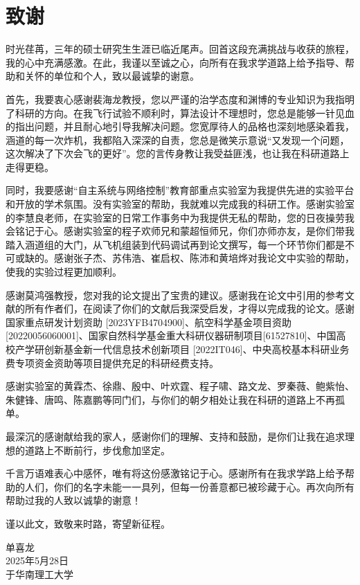\chapter{致\texorpdfstring{\quad}{}谢}

时光荏苒，三年的硕士研究生生涯已临近尾声。回首这段充满挑战与收获的旅程，我的心中充满感激。在此，我谨以至诚之心，向所有在我求学道路上给予指导、帮助和关怀的单位和个人，致以最诚挚的谢意。

首先，我要衷心感谢裴海龙教授，您以严谨的治学态度和渊博的专业知识为我指明了科研的方向。在我飞行试验不顺利时，算法设计不理想时，您总是能够一针见血的指出问题，并且耐心地引导我解决问题。您宽厚待人的品格也深刻地感染着我，涵道的每一次炸机，我都陷入深深的自责，您总是微笑示意说“又发现一个问题，这次解决了下次会飞的更好”。您的言传身教让我受益匪浅，也让我在科研道路上走得更稳。

同时，我要感谢“自主系统与网络控制”教育部重点实验室为我提供先进的实验平台和开放的学术氛围。没有实验室的帮助，我就难以完成我的科研工作。感谢实验室的李慧良老师，在实验室的日常工作事务中为我提供无私的帮助，您的日夜操劳我会铭记于心。感谢实验室的程子欢师兄和蒙超恒师兄，你们亦师亦友，是你们带我踏入涵道组的大门，从飞机组装到代码调试再到论文撰写，每一个环节你们都是不可或缺的。感谢张子杰、苏伟浩、崔启权、陈沛和黄培烨对我论文中实验的帮助，使我的实验过程更加顺利。

感谢莫鸿强教授，您对我的论文提出了宝贵的建议。感谢我在论文中引用的参考文献的所有作者们，在阅读了你们的文献后我深受启发，才得以完成我的论文。感谢国家重点研发计划资助 [2023YFB4704900]、航空科学基金项目资助 [20220056060001]、国家自然科学基金重大科研仪器研制项目[61527810]、中国高校产学研创新基金新一代信息技术创新项目 [2022IT046]、中央高校基本科研业务费专项资金资助等项目提供充足的科研经费支持。

感谢实验室的黄霖杰、徐鼎、殷中、叶欢霆、程子啸、路文龙、罗秦薇、鲍紫怡、朱健锋、唐鸣、陈嘉鹏等同门们，与你们的朝夕相处让我在科研的道路上不再孤单。

最深沉的感谢献给我的家人，感谢你们的理解、支持和鼓励，是你们让我在追求理想的道路上不断前行，步伐愈加坚定。

千言万语难表心中感怀，唯有将这份感激铭记于心。感谢所有在我求学路上给予帮助的人们，你们的名字未能一一具列，但每一份善意都已被珍藏于心。再次向所有帮助过我的人致以诚挚的谢意！

谨以此文，致敬来时路，寄望新征程。

\begin{minipage}[t]{0.945\textwidth}%
	\begin{flushright}
		单喜龙\\
		2025年5月28日\\	%
		于华南理工大学
		\par\end{flushright}
\end{minipage}

